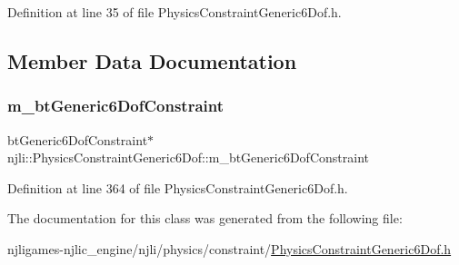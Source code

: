Definition at line 35 of file Physics\+Constraint\+Generic6\+Dof.\+h.



\subsection{Member Data Documentation}
\mbox{\label{classnjli_1_1_physics_constraint_generic6_dof_a621259b5a4a7a54505a5c73e30772c69}} 
\subsubsection{\texorpdfstring{m\+\_\+bt\+Generic6\+Dof\+Constraint}{m\_btGeneric6DofConstraint}}
{\footnotesize\ttfamily bt\+Generic6\+Dof\+Constraint$\ast$ njli\+::\+Physics\+Constraint\+Generic6\+Dof\+::m\+\_\+bt\+Generic6\+Dof\+Constraint\hspace{0.3cm}{\ttfamily [private]}}



Definition at line 364 of file Physics\+Constraint\+Generic6\+Dof.\+h.



The documentation for this class was generated from the following file\+:\begin{DoxyCompactItemize}
\item 
njligames-\/njlic\+\_\+engine/njli/physics/constraint/\mbox{\hyperlink{_physics_constraint_generic6_dof_8h}{Physics\+Constraint\+Generic6\+Dof.\+h}}\end{DoxyCompactItemize}
